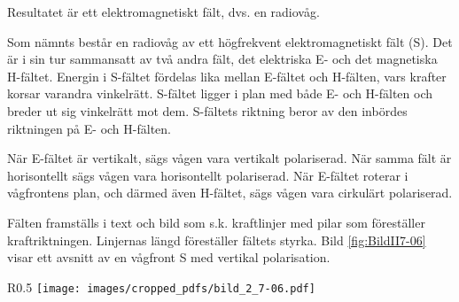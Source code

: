 Resultatet är ett elektromagnetiskt fält, dvs. en radiovåg.

Som nämnts består en radiovåg av ett högfrekvent elektromagnetiskt fält (S).
Det är i sin tur sammansatt av två andra fält, det elektriska E-
och det magnetiska H-fältet.
Energin i S-fältet fördelas lika mellan E-fältet och H-fälten,
vars krafter korsar varandra vinkelrätt.
S-fältet ligger i plan med både E- och H-fälten och breder ut sig vinkelrätt
mot dem.
S-fältets riktning beror av den inbördes riktningen på E- och H-fälten.

När E-fältet är vertikalt, sägs vågen vara vertikalt polariserad.
När samma fält är horisontellt sägs vågen vara horisontellt polariserad.
När E-fältet roterar i vågfrontens plan, och därmed även H-fältet, sägs vågen
vara cirkulärt polariserad.

Fälten framställs i text och bild som s.k. kraftlinjer med pilar som
föreställer kraftriktningen.
Linjernas längd föreställer fältets styrka.
Bild \ref{fig:BildII7-06} visar ett avsnitt av en vågfront S med vertikal
polarisation.

\begin{wrapfigure}{R}{0.5\textwidth}
\texttt{[image: images/cropped\_pdfs/bild\_2\_7-06.pdf]}
\caption{E-, H- och S-fält}
\label{fig:BildII7-06}
\end{wrapfigure}
